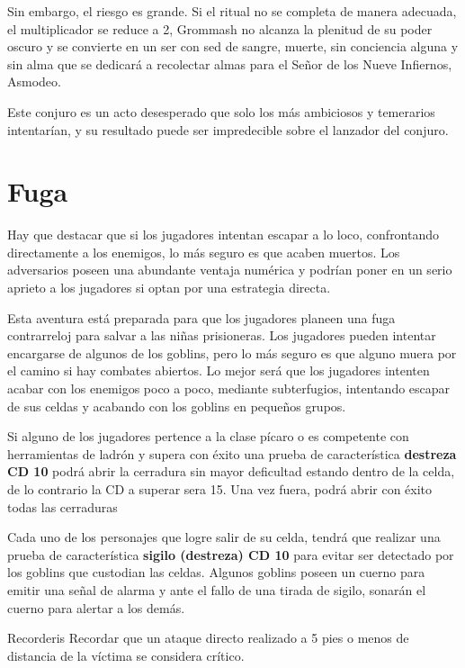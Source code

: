 \documentclass[10pt,twoside,twocolumn,openany]{dndbook}
\begin{document}
Sin embargo, el riesgo es grande. Si el ritual no se completa de manera adecuada, el multiplicador 
se reduce a 2, Grommash no alcanza la plenitud de su poder oscuro y se convierte en un ser con sed 
de sangre, muerte, sin conciencia alguna y sin alma que se dedicará a recolectar almas para el 
Señor de los Nueve Infiernos, Asmodeo.

Este conjuro es un acto desesperado que solo los más ambiciosos y temerarios intentarían, y su 
resultado puede ser impredecible sobre el lanzador del conjuro.


\section{Fuga}

Hay que destacar que si los jugadores intentan escapar a lo loco, confrontando directamente a los 
enemigos, lo más seguro es que acaben muertos. Los adversarios poseen una abundante ventaja 
numérica y podrían poner en un serio aprieto a los jugadores si optan por una estrategia directa.

Esta aventura está preparada para que los jugadores planeen una fuga contrarreloj para salvar a 
las niñas prisioneras. Los jugadores pueden intentar encargarse de algunos de los goblins, pero lo 
más seguro es que alguno muera por el camino si hay combates abiertos. Lo mejor será que los 
jugadores intenten acabar con los enemigos poco a poco, mediante subterfugios, intentando escapar 
de sus celdas y acabando con los goblins en pequeños grupos.

Si alguno de los jugadores pertence a la clase pícaro o es competente con herramientas de ladrón 
y supera con éxito una prueba de característica \textbf{destreza CD 10} podrá abrir la cerradura
sin mayor deficultad estando dentro de la celda, de lo contrario la CD a superar sera 15. Una vez 
fuera, podrá abrir con éxito todas las cerraduras 

Cada uno de los personajes que logre salir de su celda, tendrá que realizar una prueba de 
característica \textbf{sigilo (destreza) CD 10} para evitar ser detectado por los goblins que 
custodian las celdas. Algunos goblins poseen un cuerno para emitir una señal de alarma y ante el 
fallo de una tirada de sigilo, sonarán el cuerno para alertar a los demás.

\begin{DndSidebar}{Recorderis}
  Recordar que un ataque directo realizado a 5 pies o menos de distancia de la víctima se 
  considera crítico.
\end{DndSidebar}
\end{document}
